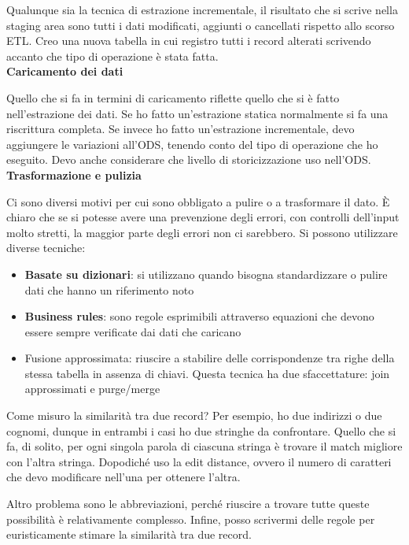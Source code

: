 Qualunque sia la tecnica di estrazione incrementale, il risultato che si scrive nella staging area sono tutti i dati modificati, aggiunti o cancellati rispetto allo scorso ETL. Creo una nuova tabella in cui registro tutti i record alterati scrivendo accanto che tipo di operazione è stata fatta. \\
\newline
\textbf{Caricamento dei dati}

Quello che si fa in termini di caricamento riflette quello che si è fatto nell’estrazione dei dati. Se ho fatto un’estrazione statica normalmente si fa una riscrittura completa. Se invece ho fatto un’estrazione incrementale, devo aggiungere le variazioni all’ODS, tenendo conto del tipo di operazione che ho eseguito. Devo anche considerare che livello di storicizzazione uso nell’ODS. \\
\newline
\textbf{Trasformazione e pulizia}

Ci sono diversi motivi per cui sono obbligato a pulire o a trasformare il dato. È chiaro che se si potesse avere una prevenzione degli errori, con controlli dell’input molto stretti, la maggior parte degli errori non ci sarebbero. Si possono utilizzare diverse tecniche:
\begin{itemize}
	\item 
	\textbf{Basate su dizionari}: si utilizzano quando bisogna standardizzare o pulire dati che hanno un riferimento noto
	\item 
	\textbf{Business rules}: sono regole esprimibili attraverso equazioni che devono essere sempre verificate dai dati che caricano  
	\item 
	Fusione approssimata: riuscire a stabilire delle corrispondenze tra righe della stessa tabella in assenza di chiavi. Questa tecnica ha due sfaccettature: join approssimati e purge/merge
\end{itemize}
Come misuro la similarità tra due record? Per esempio, ho due indirizzi o due cognomi, dunque in entrambi i casi ho due stringhe da confrontare. Quello che si fa, di solito, per ogni singola parola di ciascuna stringa è trovare il match migliore con l’altra stringa. Dopodiché uso la edit distance, ovvero il numero di caratteri che devo modificare nell’una per ottenere l’altra. 

Altro problema sono le abbreviazioni, perché riuscire a trovare tutte queste possibilità è relativamente complesso. Infine, posso scrivermi delle regole per euristicamente stimare la similarità tra due record. 

